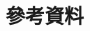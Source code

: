 \chapter*{參考資料}
\renewcommand{\baselinestretch}{10} %
\par
\renewcommand{\baselinestretch}{1} %
\twelve
\par